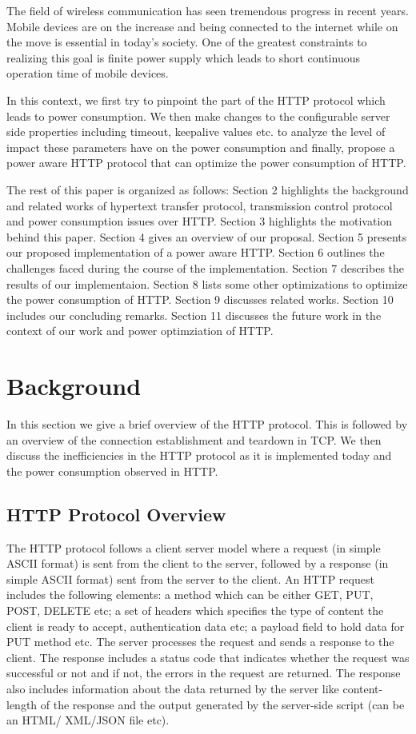 \documentclass{sigplanconf}
\begin{document}
The field of wireless communication has seen tremendous progress in recent years. Mobile devices are on the increase and being connected to the internet while on the move is essential in today’s society. One of the greatest constraints to realizing this goal is finite power supply which leads to short continuous operation time of mobile devices.

In this context, we first try to pinpoint the part of the HTTP protocol which leads to power consumption. We then make changes to the configurable server side properties including timeout, keepalive values etc. to analyze the level of impact these parameters have on the power consumption and finally, propose a power aware HTTP protocol that can optimize the power consumption of HTTP.

The rest of this paper is organized as follows: Section 2 highlights the background and related works of hypertext transfer protocol, transmission control protocol and power consumption issues over HTTP. Section 3 highlights the motivation behind this paper. Section 4 gives an overview of our proposal. Section 5 presents our proposed implementation of a power aware HTTP. Section 6 outlines the challenges faced during the course of the implementation. Section 7 describes the results of our implementaion. Section 8 lists some other optimizations to optimize the power consumption of HTTP. Section 9 discusses related works. Section 10 includes our concluding remarks. Section 11 discusses the future work in the context of our work and power optimziation of HTTP.

\section{Background}

In this section we give a brief overview of the HTTP protocol. This is followed by an overview of the connection establishment and teardown in TCP. We then discuss the inefficiencies in the HTTP protocol as it is implemented today and the power consumption observed in HTTP.

\subsection{HTTP Protocol Overview}

The HTTP protocol follows a client server model where a request (in simple ASCII format) is sent from the client to the server, followed by a response (in simple ASCII format) sent from the server to the client. An HTTP request includes the following elements: a method which can be either GET, PUT, POST, DELETE etc; a set of headers which specifies the type of content the client is ready to accept, authentication data etc; a payload field to hold data for PUT method etc. The server processes the request and sends a response to the client. The response includes a status code that indicates whether the request was successful or not and if not, the errors in the request are returned. The response also includes information about the data returned by the server like content-length of the response and the output generated by the server-side script (can be an HTML/ XML/JSON file etc). 
\end{document}
